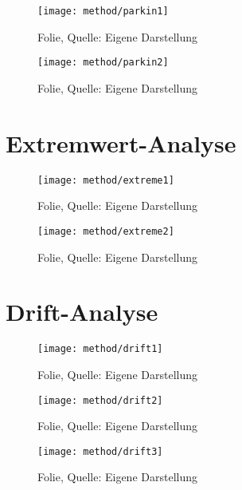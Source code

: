 \begin{figure}[H]
    \centering
    \texttt{[image: method/parkin1]}
    \caption[Folie]{Folie, Quelle: Eigene Darstellung}
    \label{fig:parkin1}
\end{figure}

\begin{figure}[H]
    \centering
    \texttt{[image: method/parkin2]}
    \caption[Folie]{Folie, Quelle: Eigene Darstellung}
    \label{fig:parkin2}
\end{figure}

\thispagestyle{scrheadings}
\section{Extremwert-Analyse}
\label{method-extreme}

\begin{figure}[H]
    \centering
    \texttt{[image: method/extreme1]}
    \caption[Folie]{Folie, Quelle: Eigene Darstellung}
    \label{fig:extreme1}
\end{figure}

\begin{figure}[H]
    \centering
    \texttt{[image: method/extreme2]}
    \caption[Folie]{Folie, Quelle: Eigene Darstellung}
    \label{fig:extreme2}
\end{figure}

\thispagestyle{scrheadings}
\section{Drift-Analyse}
\label{method-drift}

\begin{figure}[H]
    \centering
    \texttt{[image: method/drift1]}
    \caption[Folie]{Folie, Quelle: Eigene Darstellung}
    \label{fig:drift1}
\end{figure}

\begin{figure}[H]
    \centering
    \texttt{[image: method/drift2]}
    \caption[Folie]{Folie, Quelle: Eigene Darstellung}
    \label{fig:drift2}
\end{figure}

\begin{figure}[H]
    \centering
    \texttt{[image: method/drift3]}
    \caption[Folie]{Folie, Quelle: Eigene Darstellung}
    \label{fig:drift3}
\end{figure}

